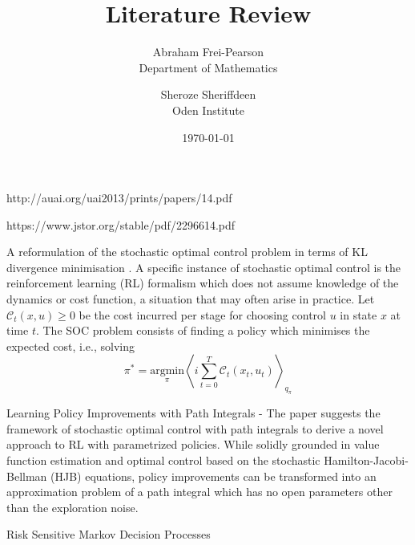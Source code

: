 \documentclass{article}
\title{Literature Review}
\author{Abraham Frei-Pearson \\
	Department of Mathematics  \\
	\and 
	Sheroze Sheriffdeen \\
	Oden Institute \\
	}
\date{\today}
\begin{document}
\maketitle

http://auai.org/uai2013/prints/papers/14.pdf

https://www.jstor.org/stable/pdf/2296614.pdf

A reformulation of the stochastic optimal control problem in terms of KL divergence minimisation \cite{rawlik2013stochastic}.  A specific instance of stochastic optimal control is the reinforcement learning (RL) formalism  which does not assume knowledge of the dynamics or cost function, a situation that may often arise in practice.  Let $\mathcal{C}_t(x, u) \ge 0$ be the cost incurred per stage for choosing control $u$ in state $x$ at time $t$. The SOC problem consists of finding a policy which minimises the expected cost, i.e., solving
\begin{equation}
    \pi^* = \underset{\pi}{\mathrm{argmin}} \left \langle i  \sum_{t=0}^T \mathcal{C}_t (x_t, u_t) \right \rangle_{q_{\pi}}
\end{equation}

Learning Policy Improvements with Path Integrals \cite{theodorou2010learning} - The paper suggests the framework of stochastic optimal control with path integrals to derive a novel approach to RL with parametrized policies. While solidly grounded in value function estimation and optimal control based on the stochastic Hamilton-Jacobi-Bellman (HJB) equations, policy improvements can be transformed into an approximation problem of a path integral which has no open parameters other than the exploration noise.

Risk Sensitive Markov Decision Processes \cite{marcus1997risk}


 

\end{document}
